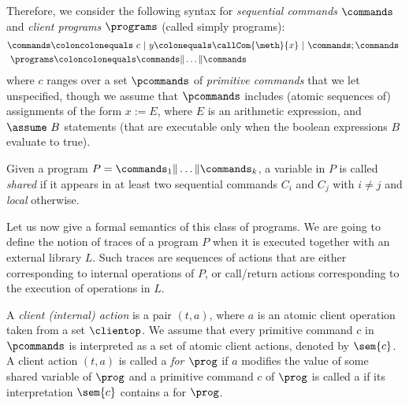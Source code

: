 Therefore, we consider the following syntax for {\em sequential commands}
$\commands$ and {\em client programs} $\programs$ (called simply programs):
\begin{align*}
\commands \coloncolonequals\ & c\ |\
y \colonequals \callCom{\meth}{x}\ |\ 
\commands; \commands\ %
\\
\programs \coloncolonequals & \commands \| \dots \| \commands
\end{align*}
where $c$ ranges over a set $\pcommands$ of {\em primitive commands} that we let unspecified, though
we assume that $\pcommands$ includes (atomic sequences of) assignments of the form $x:=E$, where $E$ is an arithmetic expression, 
and $\assume\ B$ statements (that are executable only when the boolean expressions $B$ evaluate to true). %

Given a program $P=\commands_1 \| \dots \| \commands_k$, a variable in $P$ is called \emph{shared} if it appears in at least two sequential commands $C_i$ and $C_j$ with $i\neq j$ and \emph{local} otherwise.


Let us now give a formal semantics of this class of programs. We are going to define the notion of traces of a program $P$ when it is executed together with an external library $L$. Such traces are sequences of actions that are either corresponding to internal operations of $P$, or call/return actions corresponding to the execution of operations in $L$. 

A \emph{client (internal) action} is a pair $(t,a)$, where $a$ is an atomic client operation taken from a set $\clientop$.
We assume that every primitive command $c$ in $\pcommands$ is interpreted as a set of atomic client actions, denoted by $\sem{c}$. 
A client action $(t,a)$ is called a \emph{{\shwrite} for $\prog$} if $a$ modifies the value of some shared variable of $\prog$ and 
a primitive command $c$ of $\prog$ is called a \emph{\shwrite} if its interpretation $\sem{c}$ contains a {\shwrite} for $\prog$. %



